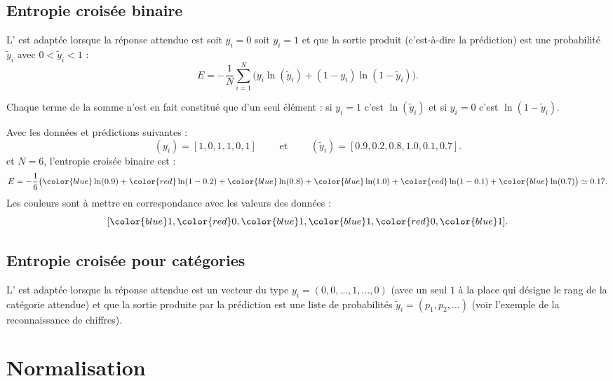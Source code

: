 \documentclass[11pt,class=report,crop=false]{standalone}
\begin{document}
    
\subsection{Entropie croisée binaire}

L' est adaptée lorsque la réponse attendue est soit $y_i=0$ soit $y_i=1$ et que la sortie produit (c'est-à-dire la prédiction) est une probabilité $\widetilde y_i$ avec $0 < \widetilde y_i < 1$ :
$$E = -\frac{1}{N} \sum_{i=1}^N \big( y_i \ln(\widetilde y_i) + (1-y_i) \ln(1-\widetilde y_i)\big).$$
  
Chaque terme de la somme n'est en fait constitué que d'un seul élément : si
$y_i=1$ c'est  $\ln(\widetilde y_i)$ et si $y_i=0$ c'est $\ln(1-\widetilde y_i)$.

  
\begin{exemple}
Avec les données et prédictions suivantes :
$$(y_i) =  [1,0,1,1,0,1]
\qquad \text{ et } \qquad
(\widetilde y_i) = [0.9,0.2,0.8,1.0,0.1,0.7].
$$
et $N=6$, l'entropie croisée binaire est : 
$$E = -\frac{1}{6} \big( 
{\color{blue}\ln(0.9)} + {\color{red}\ln(1-0.2)} + {\color{blue}\ln(0.8)} + 
{\color{blue}\ln(1.0)} + {\color{red}\ln(1-0.1)} + {\color{blue}\ln(0.7)}
\big) \simeq 0.17.$$
Les couleurs sont à mettre en correspondance avec les valeurs des données :
$$[{\color{blue}1},{\color{red}0},{\color{blue}1},{\color{blue}1},{\color{red}0},{\color{blue}1}].$$
\end{exemple} 
    
    
\subsection{Entropie croisée pour catégories}

L' est adaptée lorsque la réponse attendue est un vecteur du type $y_i=(0,0,\ldots,1,\ldots,0)$ (avec un seul $1$ à la place qui désigne le rang de la catégorie attendue) et que la sortie produite par la prédiction est une liste de probabilités $\widetilde y_i = (p_1,p_2,\ldots)$ (voir l'exemple de la reconnaissance de chiffres).
 
 
 
\section{Normalisation}
\end{document}
